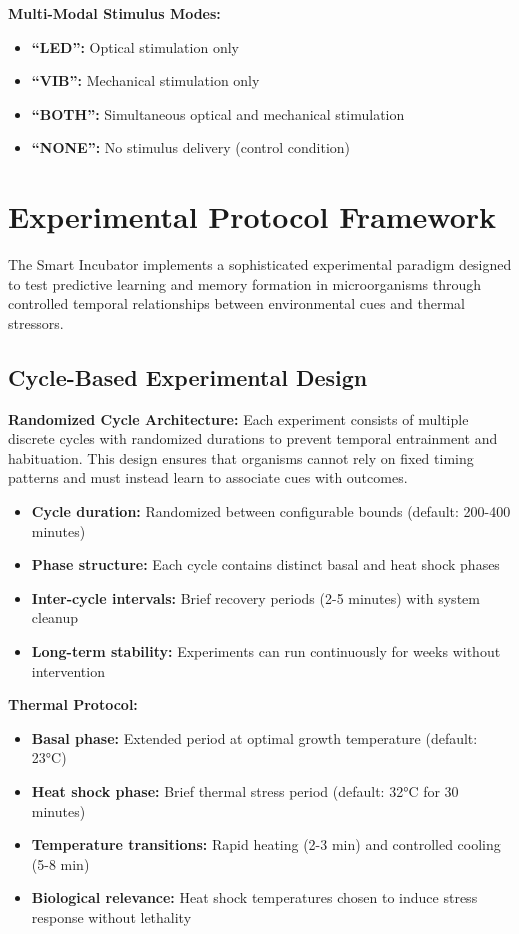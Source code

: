 \documentclass[11pt,a4paper]{article}
\begin{document}
\textbf{Multi-Modal Stimulus Modes:}
\begin{itemize}
\item \textbf{``LED'':} Optical stimulation only
\item \textbf{``VIB'':} Mechanical stimulation only  
\item \textbf{``BOTH'':} Simultaneous optical and mechanical stimulation
\item \textbf{``NONE'':} No stimulus delivery (control condition)
\end{itemize}

\section{Experimental Protocol Framework}

The Smart Incubator implements a sophisticated experimental paradigm designed to test predictive learning and memory formation in microorganisms through controlled temporal relationships between environmental cues and thermal stressors.

\subsection{Cycle-Based Experimental Design}

\textbf{Randomized Cycle Architecture:}
Each experiment consists of multiple discrete cycles with randomized durations to prevent temporal entrainment and habituation. This design ensures that organisms cannot rely on fixed timing patterns and must instead learn to associate cues with outcomes.

\begin{itemize}
\item \textbf{Cycle duration:} Randomized between configurable bounds (default: 200-400 minutes)
\item \textbf{Phase structure:} Each cycle contains distinct basal and heat shock phases
\item \textbf{Inter-cycle intervals:} Brief recovery periods (2-5 minutes) with system cleanup
\item \textbf{Long-term stability:} Experiments can run continuously for weeks without intervention
\end{itemize}

\textbf{Thermal Protocol:}
\begin{itemize}
\item \textbf{Basal phase:} Extended period at optimal growth temperature (default: 23°C)
\item \textbf{Heat shock phase:} Brief thermal stress period (default: 32°C for 30 minutes)
\item \textbf{Temperature transitions:} Rapid heating (2-3 min) and controlled cooling (5-8 min)
\item \textbf{Biological relevance:} Heat shock temperatures chosen to induce stress response without lethality
\end{itemize}
\end{document}
